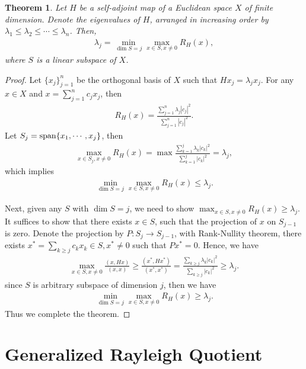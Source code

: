 \documentclass[11pt]{book}
\newtheorem{theorem}{Theorem}[section]
\theoremstyle{definition}
\numberwithin{equation}{subsection}
\begin{document}
\begin{theorem}
Let $H$ be a self-adjoint map of a Euclidean space $X$ of finite dimension. Denote the eigenvalues of $H$, arranged in increasing order by $\lambda_1 \leq \lambda_2 \leq \cdots \leq \lambda_n$. Then,
\begin{align*}
    \lambda_j = \min_{\dim S=j} \max_{x\in S, x\neq 0} R_H(x),
\end{align*}
where $S$ is a linear subspace of $X$.
\end{theorem}
\begin{proof}
Let $\{x_j\}^n_{j=1}$ be the orthogonal basis of $X$ such that $Hx_j = \lambda_j x_j$. For any $x\in X$ and $x = \sum^n_{j=1}c_j x_j$, then 
\begin{align*}
    R_H(x) = \frac{\sum^n_{j=1}\lambda_j |c_j|^2}{\sum^n_{j=1} |c_j|^2}.
\end{align*}
Let $S_j = {\rm span} \{x_1,\cdots,x_j\}$, then 
\begin{align*}
    \max_{x\in S_j, x\neq 0} R_H(x) = \max \frac{\sum^j_{k=1}\lambda_k |c_k|^2}{\sum^j_{k=1} |c_k|^2} = \lambda_j,
\end{align*}
which implies 
\begin{align*}
    \min_{\dim S=j} \max_{x\in S, x\neq 0} R_H(x) \leq \lambda_j.
\end{align*}

Next, given any $S$ with $\dim S = j$, we need to show $\max_{x\in S, x\neq 0} R_H(x) \geq \lambda_j$. It suffices to show that there exists $x\in S$, such that the projection of $x$ on $S_{j-1}$ is zero. Denote the projection by $P:S_j\to S_{j-1}$, with Rank-Nullity theorem, there exists $x^* = \sum_{k\geq j}c_k x_k \in S, x^*\neq 0$ such that $Px^* = 0$. Hence, we have
\begin{align*}
    \max_{x\in S, x\neq 0} \frac{(x,Hx)}{(x,x)} \geq \frac{(x^*, Hx^*)}{(x^*,x^*)} = \frac{\sum_{k\geq j}\lambda_k |c_k|^2}{\sum_{k\geq j} |c_k|^2} \geq \lambda_j.
\end{align*}
since $S$ is arbitrary subspace of dimension $j$, then we have
\begin{align*}
    \min_{\dim S=j} \max_{x\in S, x\neq 0} R_H(x) \geq \lambda_j.
\end{align*}
Thus we complete the theorem.
\end{proof}

\medskip

\section{Generalized Rayleigh Quotient}
\end{document}
